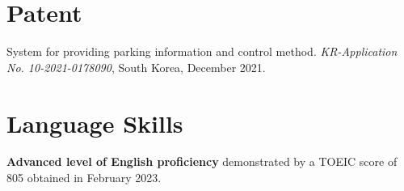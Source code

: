 \documentclass[letterpaper,11pt]{article}
\begin{document}
    \section{Patent}
    \begin{enumerate}[noitemsep, leftmargin=*,label={[\arabic*]}]
        \item{System for providing parking information and control method. \textit{KR-Application No. 10-2021-0178090}, South Korea, December 2021.}
    \end{enumerate}

    \section{Language Skills}
    {\textbf{Advanced level of English proficiency} demonstrated by a TOEIC score of 805 obtained in February 2023.} 
\end{document}
